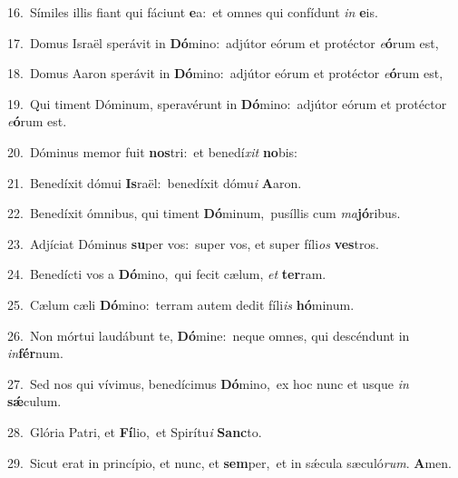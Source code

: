 {\numbfont\textcolor{\numbcolor}{16.}}~Símiles illis fiant qui fáciunt \textbf{e}\-a:~\star et omnes qui confídunt \textit{in} \textbf{e}\-is.\par
{\numbfont\textcolor{\numbcolor}{17.}}~Domus Israël sperávit in \textbf{Dó}\-mino:~\star adjútor eórum et protéctor \textit{e}\-\textbf{ó}rum est,\par
{\numbfont\textcolor{\numbcolor}{18.}}~Domus Aaron sperávit in \textbf{Dó}\-mino:~\star adjútor eórum et protéctor \textit{e}\-\textbf{ó}rum est,\par
{\numbfont\textcolor{\numbcolor}{19.}}~Qui timent Dóminum, speravérunt in \textbf{Dó}\-mino:~\star adjútor eórum et protéctor \textit{e}\-\textbf{ó}rum est.\par
{\numbfont\textcolor{\numbcolor}{20.}}~Dóminus memor fuit \textbf{nos}\-tri:~\star et benedí\textit{xit} \textbf{no}\-bis:\par
{\numbfont\textcolor{\numbcolor}{21.}}~Benedíxit dómui \textbf{Is}\-raël:~\star benedíxit dómu\textit{i} \textbf{A}\-aron.\par
{\numbfont\textcolor{\numbcolor}{22.}}~Benedíxit ómnibus, qui timent \textbf{Dó}\-minum,~\star pusíllis cum \textit{ma}\-\textbf{jó}ribus.\par
{\numbfont\textcolor{\numbcolor}{23.}}~Adjíciat Dóminus \textbf{su}\-per vos:~\star super vos, et super fíli\textit{os} \textbf{ves}\-tros.\par
{\numbfont\textcolor{\numbcolor}{24.}}~Benedícti vos a \textbf{Dó}\-mino,~\star qui fecit cælum, \textit{et} \textbf{ter}\-ram.\par
{\numbfont\textcolor{\numbcolor}{25.}}~Cælum cæli \textbf{Dó}\-mino:~\star terram autem dedit fíli\textit{is} \textbf{hó}\-minum.\par
{\numbfont\textcolor{\numbcolor}{26.}}~Non mórtui laudábunt te, \textbf{Dó}\-mine:~\star neque omnes, qui descéndunt in \textit{in}\-\textbf{fér}num.\par
{\numbfont\textcolor{\numbcolor}{27.}}~Sed nos qui vívimus, benedícimus \textbf{Dó}\-mino,~\star ex hoc nunc et usque \textit{in} \textbf{sǽ}\-culum.\par
{\numbfont\textcolor{\numbcolor}{28.}}~Glória Patri, et \textbf{Fí}\-lio,~\star et Spirítu\textit{i} \textbf{Sanc}\-to.\par
{\numbfont\textcolor{\numbcolor}{29.}}~Sicut erat in princípio, et nunc, et \textbf{sem}\-per,~\star et in sǽcula sæculó\-\textit{rum}\-. \textbf{A}\-men.\par
